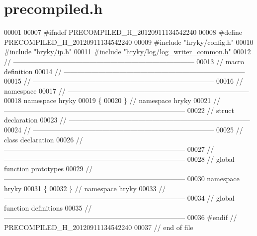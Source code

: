 \hypertarget{ip_2src_2precompiled_8h_source}{\section{precompiled.\-h}
}

\begin{DoxyCode}
00001 
00007 \textcolor{preprocessor}{#ifndef PRECOMPILED\_H\_20120911134542240}
00008 \textcolor{preprocessor}{}\textcolor{preprocessor}{#define PRECOMPILED\_H\_20120911134542240}
00009 \textcolor{preprocessor}{}\textcolor{preprocessor}{#include "hryky/config.h"}
00010 \textcolor{preprocessor}{#include "\hyperlink{ip_8h}{hryky/ip.h}"}
00011 \textcolor{preprocessor}{#include "\hyperlink{log__writer__common_8h}{hryky/log/log_writer_common.h}"}
00012 \textcolor{comment}{//
      ------------------------------------------------------------------------------}
00013 \textcolor{comment}{// macro definition}
00014 \textcolor{comment}{//
      ------------------------------------------------------------------------------}
00015 \textcolor{comment}{//
      ------------------------------------------------------------------------------}
00016 \textcolor{comment}{// namespace}
00017 \textcolor{comment}{//
      ------------------------------------------------------------------------------}
00018 \textcolor{keyword}{namespace }hryky
00019 \{
00020 \} \textcolor{comment}{// namespace hryky}
00021 \textcolor{comment}{//
      ------------------------------------------------------------------------------}
00022 \textcolor{comment}{// struct declaration}
00023 \textcolor{comment}{//
      ------------------------------------------------------------------------------}
00024 \textcolor{comment}{//
      ------------------------------------------------------------------------------}
00025 \textcolor{comment}{// class declaration}
00026 \textcolor{comment}{//
      ------------------------------------------------------------------------------}
00027 \textcolor{comment}{//
      ------------------------------------------------------------------------------}
00028 \textcolor{comment}{// global function prototypes}
00029 \textcolor{comment}{//
      ------------------------------------------------------------------------------}
00030 \textcolor{keyword}{namespace }hryky
00031 \{
00032 \} \textcolor{comment}{// namespace hryky}
00033 \textcolor{comment}{//
      ------------------------------------------------------------------------------}
00034 \textcolor{comment}{// global function definitions}
00035 \textcolor{comment}{//
      ------------------------------------------------------------------------------}
00036 \textcolor{preprocessor}{#endif // PRECOMPILED\_H\_20120911134542240}
00037 \textcolor{preprocessor}{}\textcolor{comment}{// end of file}
\end{DoxyCode}
